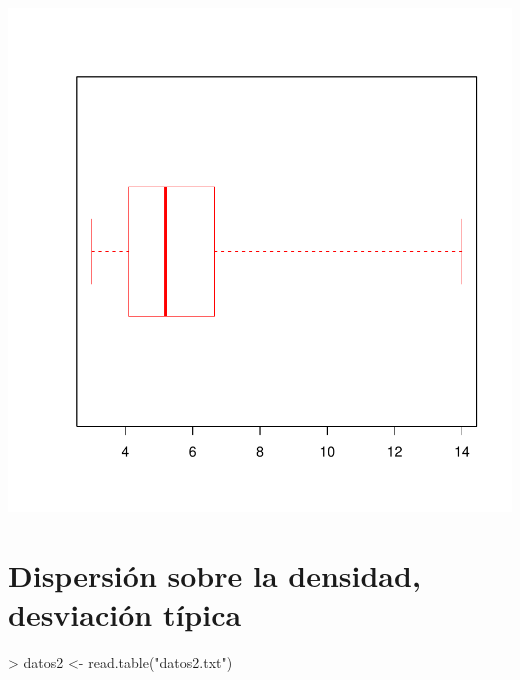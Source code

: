 \documentclass [a4paper] {article}
\begin{document}
\begin{center}
\begin{Schunk}
\end{Schunk}
\includegraphics{entrega-plot_caja_bigotes}
\end{center}

\newpage
\section{Dispersión sobre la densidad, desviación típica}

\begin{Schunk}
\begin{Sinput}
> datos2 <- read.table("datos2.txt")
\end{Sinput}
\end{Schunk}
\end{document}

